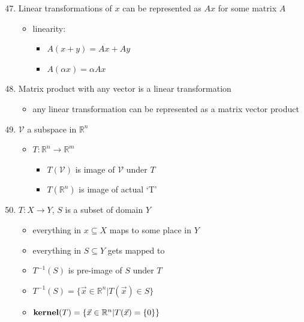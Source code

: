\documentclass[10pt,letterpaper]{article}
\begin{document}
\begin{enumerate}
\setcounter{enumi}{46}
\item  Linear transformations of $x$ can be represented as $Ax$ for some matrix $A$

\begin{itemize}
\item linearity:

\begin{itemize}
\item $A(x+y)=Ax + Ay$
\item $A(\alpha x) = \alpha Ax$
\end{itemize}

\end{itemize}

\item Matrix product with any vector is a linear transformation

\begin{itemize}
\item any linear transformation can be represented as a matrix vector product
\end{itemize}

\setcounter{enumi}{50}
\item  $\mathcal{V}$ a subspace in $\mathbb{R}^{n}$

\begin{itemize}
\item $T: \mathbb{R}^{n} \rightarrow \mathbb{R}^{m}$

\begin{itemize}
\item $T(\mathcal{V})$ is image of $\mathcal{V}$ under $T$
\item $T(\mathbb{R}^{n})$ is image of actual `T'
\end{itemize}

\end{itemize}

\item $T:X\rightarrow Y$, $S$ is a subset of domain $Y$

\begin{itemize}
\item everything in $x \subseteq X$ maps to some place in $Y$
\item everything in $S \subseteq Y$ gets mapped to
\item $T^{-1}(S)$ is pre-image of $S$ under $T$
\item $T^{-1}(S)= \{ \vec{x} \in \mathbb{R}^{n} | T( \vec{x}) \in S\}$
\item ${\bf kernel} (T)= \{ \vec{x} \in \mathbb{R}^{n} | T( \vec{x}) = \{0\}\}$
\end{itemize}

\end{enumerate}
\end{document}
